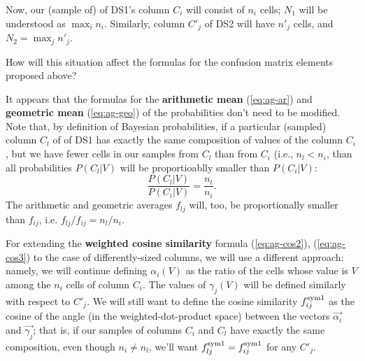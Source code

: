 \documentclass[12pt]{article}
\begin{document}
Now, our (sample of) of DS1's column $C_i$ will consist of $n_i$
cells; $N_1$ will be understood as $\max_i n_i$. Similarly, column
$C'_j$ of DS2 will have $n'_j$ cells, and $N_2=\max_j n'_j$.

How will this situation affect the formulas for the confusion matrix
elements proposed above? 

It appears that the formulas for the {\bf arithmetic mean} (\ref{eq:ag-ar})
and {\bf geometric mean} (\ref{eq:ag-geo}) of the probabilities don't need
to be modified. Note that, by definition of Bayesian probabilities, if
a particular (sampled) column $C_l$ of of DS1 has exactly the same
composition of values of the column $C_i$, but we have fewer cells in
our samples from $C_l$ than from $C_i$ (i.e., $n_l < n_i$, than all
probabilities $P(C_l|V)$ will be proportioablly smaller than
$P(C_i|V)$:
$$
\frac{P(C_l|V)}{P(C_i|V)} = \frac{n_l}{n_i}.
$$ The arithmetic and geometric averages $f_{lj}$ will, too, be
proportionally smaller than $f_{ij}$, i.e. $f_{lj}/f_{ij}=n_l/n_i$.

For extending the {\bf weighted cosine similarity} formula
(\ref{eq:ag-cos2}), (\ref{eq:ag-cos3}) to the case of differently-sized
columns, we will use a different approach: namely, we will continue
defining $\alpha_i(V)$ as the ratio of the cells whose value is $V$
among the $n_i$ cells of column $C_i$. The values of $\gamma_j(V)$
will be defined similarly with respect to $C'_j$. We will still want
to define the cosine similarity $f_{ij}^{\rm sym 1}$ as the
cosine of the angle (in the weighted-dot-product space) between the
vectors $\vec{\alpha_i}$ and $\vec{\gamma_j}$; that is, if our samples
of columns $C_i$ and $C_l$ have exactly the same composition, even
though $n_i \ne n_l$, we'll want $f_{lj}^{\rm sym 1} =
f_{ij}^{\rm sym 1}$ for any $C'_j$.
\end{document}
